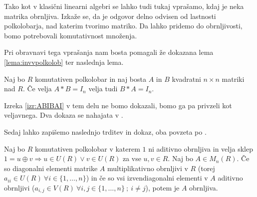 \documentclass[mat1]{fmfdelo}
\begin{document}
Tako kot v klasični linearni algebri se lahko tudi tukaj vprašamo, kdaj je neka matrika obrnljiva. Izkaže se, da je odgovor delno odvisen od lastnosti polkolobarja, nad katerim tvorimo matriko. Da lahko pridemo do obrnljivosti, bomo potrebovali komutativnost množenja.

Pri obravnavi tega vprašanja nam bosta pomagali že dokazana lema \ref{lema:invvpolkolob} ter naslednja lema.

\begin{izrek}\label{izr:ABIBAI}
	Naj bo $R$ komutativen polkolobar in naj bosta $A$ in $B$ kvadratni $n\times n$ matriki nad $R$. Če velja $A*B = I_n$ velja tudi $B*A=I_n$.
\end{izrek}

Izreka \ref{izr:ABIBAI} v tem delu ne bomo dokazali, bomo ga pa privzeli kot veljavnega. Dva dokaza se nahajata v \cite[poglavje 3 in poglavje 4]{bib:Reutenauer}.

Sedaj lahko zapišemo naslednjo trditev in dokaz, oba povzeta po \cite[lema 2.\ 3.]{bib:Tanbase}.

\begin{trditev}\label{trd:obrnljMatr}
	Naj bo $R$ komutativen polkolobar v katerem $1$ ni aditivno obrnljiva in velja sklep $1 = u \oplus v \Rightarrow u\in U(R) \lor v\in U(R)$ za vse $u, v \in R$. Naj bo $A\in M_n(R)$. Če so diagonalni elementi matrike $A$ multiplikativno obrnljivi v $R$ (torej $a_{ii}\in U(R)~\forall i \in \{1, \ldots, n\}$) in če so vsi izvendiagonalni elementi v $A$ aditivno obrnljivi ($a_{i,j}\in V(R)~\forall i, j\in \{1, \ldots, n\} ~;~i\neq j$), potem je $A$ obrnljiva.
\end{trditev}
\end{document}
